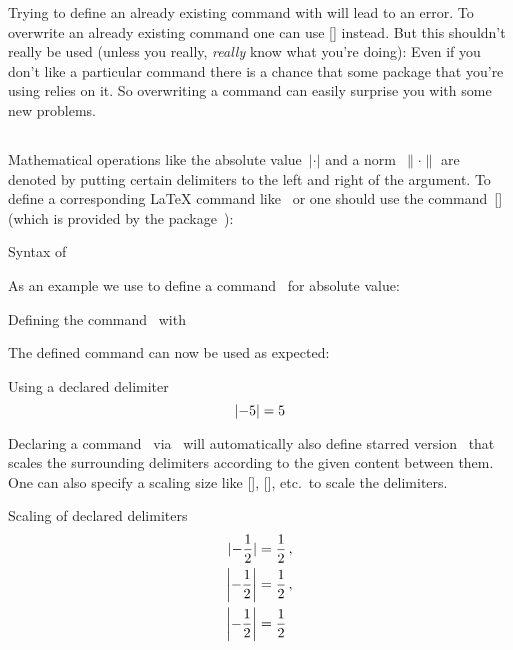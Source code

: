 Trying to define an already existing command with  will lead to an error.
To overwrite an already existing command one can use [\comname] instead.
But this shouldn’t really be used (unless you really, \emph{really} know what you’re doing):
Even if you don’t like a particular command there is a chance that some package that you’re using relies on it.
So overwriting a command can easily surprise you with some new problems.



\subsection{}

Mathematical operations like the absolute value~$\lvert \cdot \rvert$ and a norm~$\lVert \cdot \rVert$ are denoted by putting certain delimiters to the left and right of the argument.
To define a corresponding {\LaTeX} command like~ or  one should use the command~[\comname] (which is provided by the package~):
\begin{showcode}{Syntax of }
\end{showcode}
As an example we use  to define a command~ for absolute value:
\begin{showcode}{Defining the command~ with }
\DeclarePairedDelimiter{\abs}{\lvert}{\rvert}
\end{showcode}
The defined command can now be used as expected:
\begin{showlatex}{Using a declared delimiter}
  \[
    \abs{-5} = 5
  \]
\end{showlatex}

Declaring a command~ via~ will automatically also define starred version~ that scales the surrounding delimiters according to the given content between them.
One can also specify a scaling size like [\comname], [\comname], etc.\ to scale the delimiters.
\begin{showlatex}{Scaling of declared delimiters}
\begin{align*}
  \abs{-\frac{1}{2}}
  &=
  \frac{1}{2} \,,
  \\
  \abs*{-\frac{1}{2}}
  &=
  \frac{1}{2} \,,
  \\
  \abs[\bigg]{-\frac{1}{2}}
  &=
  \frac{1}{2}
\end{align*}
\end{showlatex}

